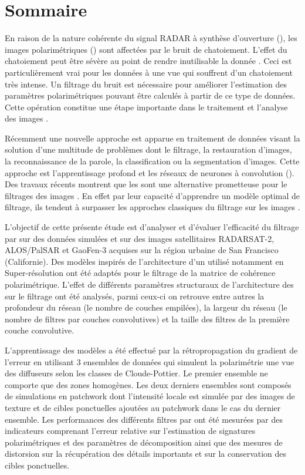 \chapter*{Sommaire}

En raison de la nature cohérente du signal RADAR à synthèse d’ouverture (\acrsarns), les images \acrsar polarimétriques (\acrpolsarns) sont affectées par le bruit de chatoiement. L’effet du chatoiement peut être sévère au point de rendre inutilisable la donnée \acrpolsarns. Ceci est particulièrement vrai pour les données à une vue qui souffrent d’un chatoiement très intense. Un filtrage du bruit est nécessaire pour améliorer l’estimation des paramètres polarimétriques pouvant être calculés à partir de ce type de données. Cette opération constitue une étape importante dans le traitement et l’analyse des images \acrpolsarns. 

Récemment une nouvelle approche est apparue en traitement de données visant la solution d’une multitude de problèmes dont le filtrage, la restauration d’images, la reconnaissance de la parole, la classification ou la segmentation d’images.  Cette approche est l’apprentissage profond et les réseaux de neurones à convolution (\acrconvnetns). Des travaux récents montrent que les \acrconvnet sont une alternative prometteuse pour le filtrages des images \acrsarns.  En effet par leur capacité d’apprendre un modèle optimal de filtrage, ils tendent à surpasser les approches classiques du filtrage sur les images \acrsarns.

L'objectif de cette présente étude est d'analyser et d'évaluer l'efficacité du filtrage par \acrconvnet sur des données \acrpolsar simulées et sur des images satellitaires \acrpolsar RADARSAT-2, ALOS/PalSAR et GaoFen-3 acquises sur la région urbaine de San Francisco (Californie).   Des modèles inspirés de l'architecture d'un \acrconvnet utilisé notamment en Super-résolution ont été adaptés pour le filtrage de la matrice de cohérence polarimétrique. L'effet de différents paramètres structuraux de l'architecture des \acrconvnet sur le filtrage ont été analysés, parmi ceux-ci on retrouve entre autres la profondeur du réseau (le nombre de couches empilées), la largeur du réseau (le nombre de filtres par couches convolutives) et la taille des filtres de la première couche convolutive.  

L'apprentissage des modèles a été effectué par la rétropropagation du gradient de l'erreur en utilisant 3 ensembles de données qui simulent la polarimétrie une vue des diffuseurs selon les classes de Cloude-Pottier. Le premier ensemble ne comporte que des zones homogènes.  Les deux derniers ensembles sont composés de simulations en patchwork dont l'intensité locale est simulée par des images de texture et de cibles ponctuelles ajoutées au patchwork dans le cas du dernier ensemble. Les performances des différents filtres par \acrconvnet ont été mesurées par des indicateurs comprenant l'erreur relative sur l'estimation de signatures polarimétriques et des paramètres de décomposition ainsi que des mesures de distorsion sur la récupération des détails importants et sur la conservation des cibles ponctuelles. 

